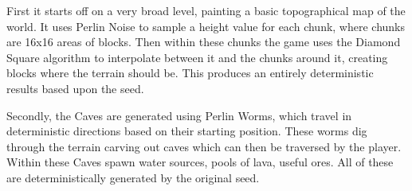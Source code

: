 \begin{flushleft}
                    \vspace{0.2cm}

                    First it starts off on a very broad level, painting a basic topographical map of the world. It uses Perlin Noise to sample
                    a height value for each chunk, where chunks are 16x16 areas of blocks. Then within these chunks the game uses the Diamond Square
                    algorithm to interpolate between it and the chunks around it, creating blocks where the terrain should be. This produces an 
                    entirely deterministic results based upon the seed.\\

                    \vspace{0.2cm}

                    Secondly, the Caves are generated using Perlin Worms, which travel in deterministic directions based on their starting position.
                    These worms dig through the terrain carving out caves which can then be traversed by the player. Within these Caves spawn water
                    sources, pools of lava, useful ores. All of these are deterministically generated by the original seed. \\ 


                    \begin{figure}[h]
                        \centering
                        \qquad
                    \end{figure}


\end{flushleft}
